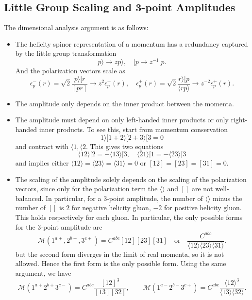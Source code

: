 \subsection{Little Group Scaling and 3-point Amplitudes}

The dimensional analysis argument is as follows: 
\begin{itemize}
	\item The helicity spinor representation of a momentum has a redundancy captured by the little group transformation
	\[
		p \rangle \to z p \rangle, \quad [p \to z^{-1} [p.
	\]
	And the polarization vectors scale as
	\[
	\epsilon_p^{-}(r)=\sqrt{2} \frac{p\rangle[r}{[p r]} \rightarrow z^2 \epsilon_p^{-}(r), \quad \epsilon_p^{+}(r)=\sqrt{2} \frac{r\rangle[p}{\langle r p\rangle} \rightarrow z^{-2} \epsilon_p^{+}(r)
	.\]
	\item The amplitude only depends on the inner product between the momenta.
	\item The amplitude must depend on only left-handed inner products or only right-handed inner products. To see this, start from momentum conservation
	\[
		1\rangle  [ 1 +  2\rangle [ 2 + 3\rangle  [ 3 = 0
	\]
	and contract with $\langle 1, \langle 2$. This gives two equations
	\[
	\langle 12\rangle[2=-\langle 13\rangle[3, \quad\langle 21\rangle[1=-\langle 23\rangle[3
	\]
	and implies either $\langle 12\rangle = \langle 23\rangle = \langle 31\rangle = 0$ or $[12] = [23] = [31] = 0$. 
	\item The scaling of the amplitude solely depends on the scaling of the polarization vectors, since only for the polarization term the $\langle \rangle$ and $[]$ are not well-balanced. In particular, for a 3-point amplitude, the number of $\langle \rangle$ minus the number of $[]$ is $2$ for negative helicity gluon, $-2$ for positive helicity gluon. This holds respectively for each gluon. 
	In particular, the only possible forms for the 3-point amplitude are
	\[
	\mathcal{M}(1^{a+}, 2^{b+}, 3^{c+}) = C^{abc} [12][23][31] \quad \text{or} \quad \frac{C^{abc}}{\langle 12\rangle \langle 23\rangle \langle 31\rangle}.
	\]
	but the second form diverges in the limit of real momenta, so it is not allowed. Hence the first form is the only possible form.
	Using the same argument, we have
	\[
	\mathcal{M}\left(1^{a+} 2^{b+} 3^{c-}\right)=C^{a b c} \frac{[12]^3}{[13][32]} , \qquad 
	\mathcal{M}\left(1^{a-} 2^{b-} 3^{c+}\right)=C^{a b c} \frac{\langle 12\rangle^3}{\langle 13\rangle\langle 32\rangle}.
	\]
\end{itemize}

